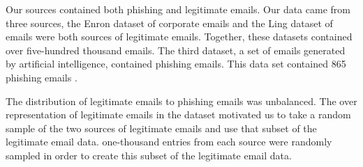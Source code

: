 \documentclass[article,pdftex,10pt,a4paper,twocolumn]{article}
\begin{document}






 
Our sources contained both phishing and legitimate emails. Our data came from three sources, the Enron dataset of corporate emails \citep{cohen} and the Ling dataset of emails \citep{sakkis} were both sources of legitimate emails. Together, these datasets contained over five-hundred thousand emails. The third dataset, a set of emails generated by artificial intelligence, contained phishing emails. This data set contained 865 phishing emails \citep{shamir}.

The distribution of legitimate emails to phishing emails was unbalanced. The over representation of legitimate emails in the dataset motivated us to take a random sample of the two sources of legitimate emails and use that subset of the legitimate email data. one-thousand entries from each source were randomly sampled in order to create this subset of the legitimate email data.
\end{document}
